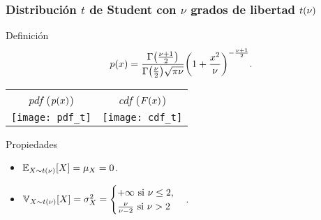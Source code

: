 \documentclass[table]{beamer}
\begin{document}
\begin{frame}
    \frametitle{Distribución $t$ de Student con $\nu$ grados de libertad $\tdist{\nu}$}
    \begin{block}{Definición}
        \begin{equation*}
            \pdf{x} = \frac{\gammafunc{\frac{\nu + 1}{2}}}{\gammafunc{\frac{\nu}{2}} \sqrt{\pi \nu}} \parens{1 + \frac{x^{2}}{\nu}}^{- \frac{\nu + 1}{2}} .
        \end{equation*}
    \end{block}
    \begin{center}
        \begin{tabular}{cc}
            \emph{pdf} ($\pdf{x}$) & \emph{cdf} ($\FF{x}$) \\
            \texttt{[image: pdf\_t]} &
            \texttt{[image: cdf\_t]} \\
        \end{tabular}
    \end{center}
    \begin{block}{Propiedades}
        \begin{itemize}
            \item $\expecteddist{X \sim \tdist{\nu}}{X} = \mu_{X} = 0$.
            \item $\variancedist{X \sim \tdist{\nu}}{X} = \sigma^{2}_{X} = \begin{cases} + \infty \text{ si } \nu \leq 2 , \\ \frac{\nu}{\nu - 2} \text{ si } \nu > 2 \end{cases}$.
        \end{itemize}
    \end{block}
\end{frame}
\end{document}
